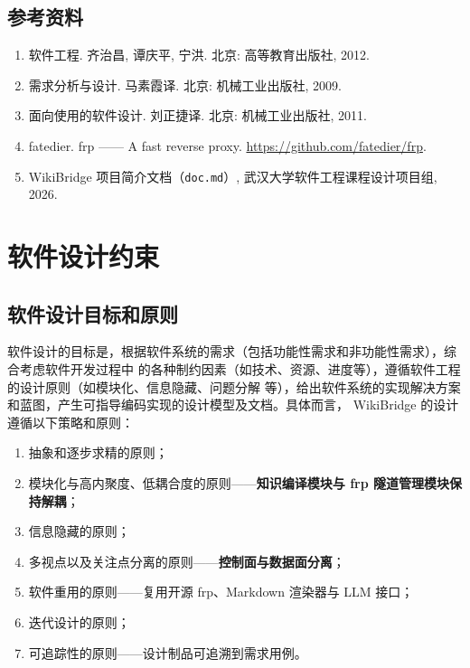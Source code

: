 \documentclass[UTF8,a4paper,12pt]{ctexart}
\newcommand{\keypoint}[1]{\textcolor{whu}{\textbf{#1}}}
\newcommand{\code}[1]{\texttt{#1}}
\begin{document}
\subsection{参考资料}
\begin{enumerate}[leftmargin=2.4em]
  \item 软件工程. 齐治昌, 谭庆平, 宁洪. 北京: 高等教育出版社, 2012.
  \item 需求分析与设计. 马素霞译. 北京: 机械工业出版社, 2009.
  \item 面向使用的软件设计. 刘正捷译. 北京: 机械工业出版社, 2011.
  \item fatedier. frp —— A fast reverse proxy. \url{https://github.com/fatedier/frp}.
  \item WikiBridge 项目简介文档（\code{doc.md}）, 武汉大学软件工程课程设计项目组, 2026.
\end{enumerate}

\section{软件设计约束}

\subsection{软件设计目标和原则}
软件设计的目标是，根据软件系统的需求（包括功能性需求和非功能性需求），综合考虑软件开发过程中
的各种制约因素（如技术、资源、进度等），遵循软件工程的设计原则（如模块化、信息隐藏、问题分解
等），给出软件系统的实现解决方案和蓝图，产生可指导编码实现的设计模型及文档。具体而言，
WikiBridge 的设计遵循以下策略和原则：
\begin{enumerate}[leftmargin=2.4em]
  \item 抽象和逐步求精的原则；
  \item 模块化与高内聚度、低耦合度的原则——\keypoint{知识编译模块与 frp 隧道管理模块保持解耦}；
  \item 信息隐藏的原则；
  \item 多视点以及关注点分离的原则——\keypoint{控制面与数据面分离}；
  \item 软件重用的原则——复用开源 frp、Markdown 渲染器与 LLM 接口；
  \item 迭代设计的原则；
  \item 可追踪性的原则——设计制品可追溯到需求用例。
\end{enumerate}
\end{document}
